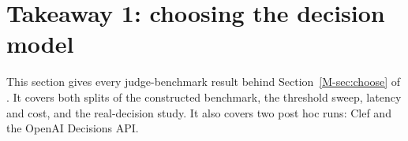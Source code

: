 \section{Takeaway 1: choosing the decision model}\label{sec:b}

This section gives every judge-benchmark result behind Section~\ref{M-sec:choose} of \mainpaper{}. It covers both
splits of the constructed benchmark, the threshold sweep, latency and cost, and the real-decision study. It also
covers two post hoc runs: Clef and the OpenAI Decisions API.











